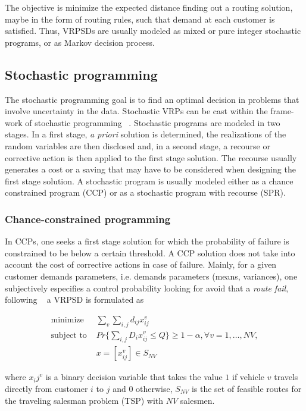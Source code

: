 The objective is minimize the expected distance finding out a routing solution, maybe in the form of routing rules, such that demand
at each customer is satisﬁed. Thus, VRPSDs are usually modeled as mixed or pure integer stochastic programs, or as Markov decision process.


\subsection{Stochastic programming}

The stochastic programming goal is to find an optimal decision in problems that involve uncertainty in the data. Stochastic VRPs can be cast within the frame-work of stochastic programming ~\cite{gendreau_stochastic_1996}. Stochastic programs are modeled in two stages. In a first stage, \textit{a priori} solution is determined, the realizations of the random variables are then disclosed and, in a second stage, a recourse or corrective action is then applied to the first stage solution. The recourse usually generates a cost or a saving that may have to be considered when designing the first stage solution. A stochastic program is usually modeled either as a chance constrained program (CCP) or as a stochastic program with recourse (SPR). 

 
\subsubsection{Chance-constrained programming}

In CCPs, one seeks a first stage solution for which the probability of failure is constrained to be below a certain threshold. A CCP solution does not take into account the cost of corrective actions in case of failure. Mainly, for a given customer demands parameters, i.e. demands parameters (means, variances), one subjectively especifies a control probability looking for avoid that a \textit{route fail}, following ~\cite{Dror_2005} a VRPSD is formulated as

\begin{align}\label{eq:CCP}
 \text{minimize } & \sum_v\sum_{i,j}d_{ij}x_{ij}^v\\
 \text{subject to } & Pr\{\sum_{i,j}D_ix_{ij}^v \leq Q\} \geq 1-\alpha, \forall v = 1,\ldots,NV,\\
  & x = [x_{ij}^v] \in S_{NV}
\end{align}

where $x_ij^v$ is a binary decision variable that takes the value $1$ if vehicle $v$ travels directly from customer $i$ to $j$ and $0$ otherwise, $S_{NV}$ is the set of feasible routes for the traveling salesman problem (TSP) with $NV$ salesmen.

